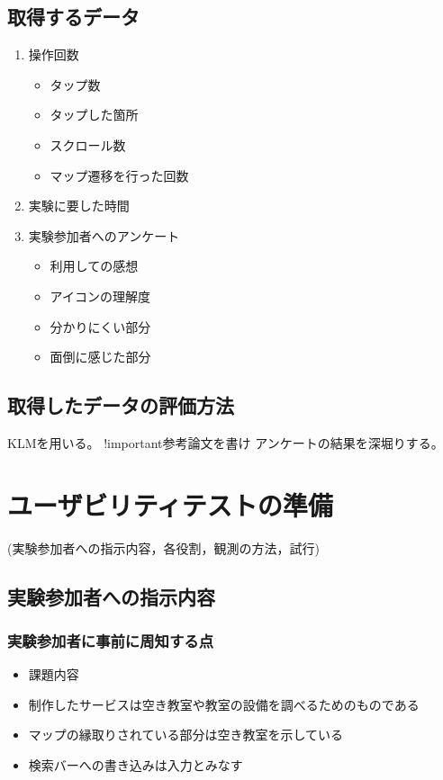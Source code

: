 \documentclass[12pt,a4paper,dvipdf]{jsarticle}
\begin{document}
\subsection{取得するデータ}
\begin{enumerate}
    \item 操作回数
          \begin{itemize}
              \item タップ数
              \item タップした箇所
              \item スクロール数
              \item マップ遷移を行った回数
          \end{itemize}
    \item 実験に要した時間
    \item 実験参加者へのアンケート
          \begin{itemize}
              \item 利用しての感想
              \item アイコンの理解度
              \item 分かりにくい部分
              \item 面倒に感じた部分
          \end{itemize}
\end{enumerate}
\subsection{取得したデータの評価方法}
KLMを用いる。
!important参考論文を書け
アンケートの結果を深堀りする。
\section{ユーザビリティテストの準備}
 (実験参加者への指示内容，各役割，観測の方法，試行)
\subsection{実験参加者への指示内容}
\subsubsection{実験参加者に事前に周知する点}
\begin{itemize}
    \item 課題内容
    \item 制作したサービスは空き教室や教室の設備を調べるためのものである
    \item マップの縁取りされている部分は空き教室を示している
    \item 検索バーへの書き込みは入力とみなす
\end{itemize}
\end{document}
